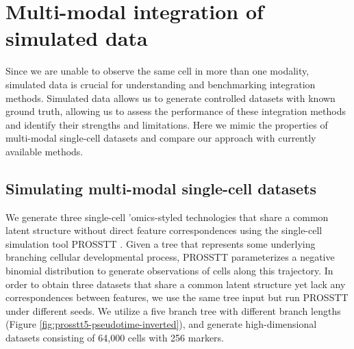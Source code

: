 \section{Multi-modal integration of simulated data}
Since we are unable to observe the same cell in more than one modality, simulated data is crucial for understanding and benchmarking integration methods.
Simulated data allows us to generate controlled datasets with known ground truth, allowing us to assess the performance of these integration methods and identify their strengths and limitations.
Here we mimic the properties of multi-modal single-cell datasets and compare our approach with currently available methods.

\subsection{Simulating multi-modal single-cell datasets}
 We generate three single-cell 'omics-styled technologies that share a common latent structure without direct feature correspondences using the single-cell simulation tool PROSSTT \citep{Papadopoulos2019}.
Given a tree that represents some underlying branching cellular developmental process, PROSSTT parameterizes a negative binomial distribution to generate observations of cells along this trajectory.
In order to obtain three datasets that share a common latent structure yet lack any correspondences between features,  we use the same tree input but run PROSSTT under different seeds.
We utilize a five branch tree with different branch lengths (Figure \ref{fig:prosstt5-pseudotime-inverted}),
and generate high-dimensional datasets consisting of 64,000 cells with 256 markers.

